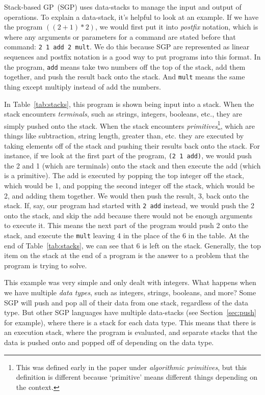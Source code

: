 \documentclass{sig-alternate}
\begin{document}
Stack-based GP~(SGP) uses data-stacks to manage the input and output of operations. To explain a data-stack, it's helpful to look at an example. If we have the program $((2+1)*2)$, we would first put it into \textit{postfix} notation, which is where any arguments or parameters for a command are stated before that command: \texttt{2~1~add~2~mult}. We do this because SGP are represented as linear sequences and postfix notation is a good way to put programs into this format. In the program, \texttt{add} means take two numbers off the top of the stack, add them together, and push the result back onto the stack. And \texttt{mult} means the same thing except multiply instead of add the numbers.

In Table~\ref{tab:stacks}, this program is shown being input into a stack. When the stack encounters \textit{terminals}, such as strings, integers, booleans, etc., they are simply pushed onto the stack. When the stack encounters \textit{primitives}\footnote{This was defined early in the paper under \textit{algorithmic primitives}, but this definition is different because `primitive' means different things depending on the context.}, which are things like subtraction, string length, greater than, etc. they are executed by taking elements off of the stack and pushing their results back onto the stack. For instance, if we look at the first part of the program, \texttt{(2~1~add)}, we would push the 2 and 1 (which are terminals) onto the stack and then execute the add (which is a primitive). The add is executed by popping the top integer off the stack, which would be 1, and popping the second integer off the stack, which would be 2, and adding them together. We would then push the result, 3, back onto the stack. If, say, our program had started with \texttt{2 add} instead, we would push the 2 onto the stack, and skip the add because there would not be enough arguments to execute it. This means the next part of the program would push 2 onto the stack, and execute the \texttt{mult} leaving 4 in the place of the 6 in the table. At the end of Table~\ref{tab:stacks}, we can see that 6 is left on the stack. Generally, the top item on the stack at the end of a program is the answer to a problem that the program is trying to solve.

This example was very simple and only dealt with integers. What happens when we have multiple \textit{data types}, such as integers, strings, booleans, and more? Some SGP will push and pop all of their data from one stack, regardless of the data type. But other SGP languages have multiple data-stacks (see Section~\ref{sec:push} for example), where there is a stack for each data type. This means that there is an execution stack, where the program is evaluated, and separate stacks that the data is pushed onto and popped off of depending on the data type.
\end{document}
